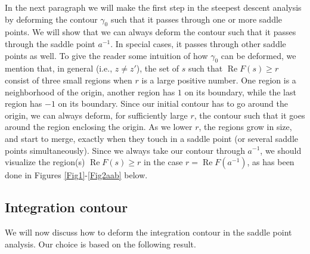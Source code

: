 \documentclass[%
 jmp,
cp,  %
 amsmath,amsthm,amssymb,%
 reprint,%
onecolumn]{revtex4-2}
\begin{document}
    In the next paragraph we will make the first step in the  steepest descent analysis by deforming the contour $\gamma_0$ such that it passes through one or more saddle points. We will show that we can always deform the contour such that it passes through the saddle point $a^{-1}$. In special cases, it passes through other saddle points as well. To give the reader some intuition of how $\gamma_0$ can be deformed, we mention that, in general (i.e., $z\neq z'$), the set of $s$ such that $\operatorname{Re} F(s)\geq r$ consist of three small  regions when $r$ is a large positive number. One region is a neighborhood of the origin, another region has $1$ on its boundary, while the last region has $-1$ on its boundary. Since our initial contour has to go around the origin,  we can always deform, for sufficiently large $r$, the contour such that it goes around the region enclosing the origin.  As we lower $r$, the regions grow in size, and start to merge, exactly when they touch in a saddle point (or several saddle points simultaneously). Since we always take our contour through $a^{-1}$, we should visualize the region(s) $\operatorname{Re} F(s)\geq r$ in the case $r=\operatorname{Re} F(a^{-1})$, as has been done in Figures \ref{Fig1}-\ref{Fig2aab} below. 

\subsection{Integration contour}

We will now discuss how to deform the integration contour in the saddle point analysis. Our choice is based on the following result. 
\end{document}
